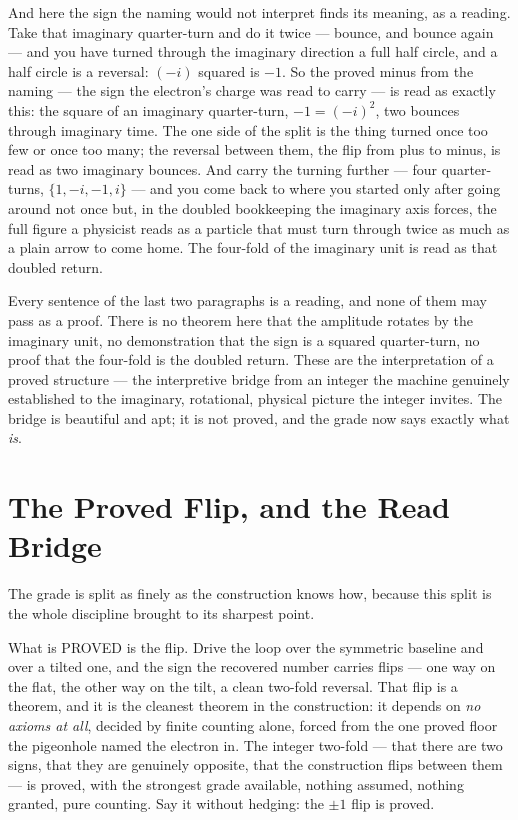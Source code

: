 And here the sign the naming would not interpret finds its meaning, as a reading. Take that imaginary quarter-turn
and do it twice --- bounce, and bounce again --- and you have turned through the imaginary direction a full half
circle, and a half circle is a reversal: $(-i)$ squared is $-1$. So the proved minus from the naming --- the sign
the electron's charge was read to carry --- is read as exactly this: the square of an imaginary
quarter-turn, $-1 = (-i)^2$, two bounces through imaginary time. The one side of the split is the thing turned once
too few or once too many; the reversal between them, the flip from plus to minus, is read as two imaginary
bounces. And carry the turning further --- four quarter-turns, $\{1, -i, -1, i\}$ --- and you come back to where you
started only after going around not once but, in the doubled bookkeeping the imaginary axis forces, the full
figure a physicist reads as a particle that must turn through twice as much as a plain arrow to come home. The
four-fold of the imaginary unit is read as that doubled return.

Every sentence of the last two paragraphs is a reading, and none of them may pass as a proof.
There is no theorem here that the amplitude rotates by the imaginary unit, no demonstration that the sign is a
squared quarter-turn, no proof that the four-fold is the doubled return. These are the interpretation of a
proved structure --- the interpretive bridge from an integer the machine genuinely established to the imaginary,
rotational, physical picture the integer invites. The bridge is beautiful and apt; it is not proved, and the
grade now says exactly what \emph{is}.

\section{The Proved Flip, and the Read Bridge}

The grade is split as finely as the construction knows how, because this split is the whole discipline brought to its
sharpest point.

What is PROVED is the flip. Drive the loop over the symmetric baseline and over a tilted one, and the sign the
recovered number carries flips --- one way on the flat, the other way on the tilt, a clean two-fold reversal. That
flip is a theorem, and it is the cleanest theorem in the construction: it depends on \emph{no axioms at all}, decided by
finite counting alone, forced from the one proved floor the pigeonhole named the electron in. The integer
two-fold --- that there are two signs, that they are genuinely opposite, that the construction flips between them
--- is proved, with the strongest grade available, nothing assumed, nothing granted, pure counting. Say it
without hedging: the $\pm 1$ flip is proved.

